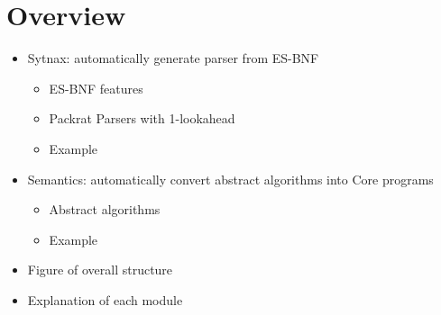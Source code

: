 \section{Overview}


\begin{itemize}
  \item Sytnax: automatically generate parser from ES-BNF
    \begin{itemize}
      \item ES-BNF features
      \item Packrat Parsers with 1-lookahead
      \item Example
    \end{itemize}
  \item Semantics: automatically convert abstract algorithms into Core programs
    \begin{itemize}
      \item Abstract algorithms
      \item Example
    \end{itemize}
\end{itemize}
\begin{itemize}
  \item Figure of overall structure
  \item Explanation of each module
\end{itemize}

